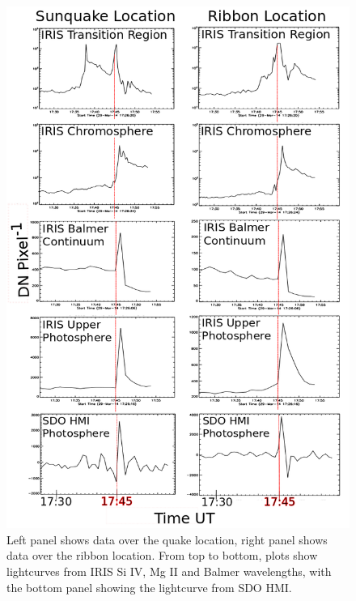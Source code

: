 \begin{figure}%
  \begin{center}
  \includegraphics[width=1.0\textwidth]{lcseries-bold}
  \end{center}
  \caption{Left panel shows data over the quake location, right panel shows data over the ribbon location. From top to bottom, plots show lightcurves from IRIS Si IV, Mg II and Balmer wavelengths, with the bottom panel showing the lightcurve from SDO HMI.}\label{lcseries-bold}
\end{figure}

